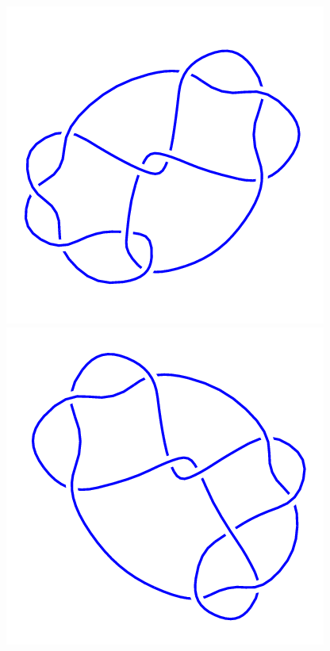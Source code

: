 \begin{figure}[H]
\begin{minipage}[b]{.18\linewidth}
	\end{minipage}
	\begin{minipage}[b]{.18\linewidth}
		\centering
		\includegraphics[width=\linewidth]{../data/10_24.png}
	\end{minipage}
	\begin{minipage}[b]{.18\linewidth}
		\centering
		\includegraphics[width=\linewidth]{../data/10_25.png}

\end{minipage}
\end{figure}
